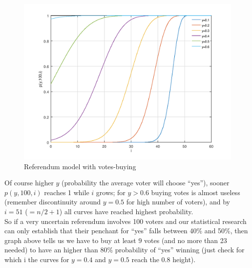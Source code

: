 \documentclass[10pt,a4paper]{article}
\begin{document}
	\begin{figure}[H]	
		\centering
		\includegraphics[height=0.26\textheight]{FIG/buying.png}
		\caption{Referendum model with votes-buying}
		\label{fig:buying}
	\end{figure}
	Of course higher $y$ (probability the average voter will choose \enquote{yes}), sooner $p(y,100,i)$ reaches 1 while $i$ grows; for $y > 0.6$ buying votes is almost useless (remember discontinuity around $y = 0.5$ for high number of voters), and by $i = 51$ ($= n/2 +1$) all curves have reached highest probability.\\
	So if a very uncertain referendum involves 100 voters and our statistical research can only establish that their penchant for \enquote{yes} falls between 40\% and 50\%, then graph above tells us we have to buy at least 9 votes (and no more than 23 needed) to have an higher than 80\% probability of \enquote{yes} winning (just check for which i the curves for $y=0.4$ and $y=0.5$ reach the 0.8 height).
	
\end{document}
